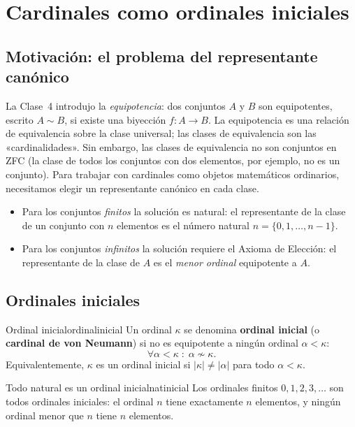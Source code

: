 \section{Cardinales como ordinales iniciales}

\subsection{Motivación: el problema del representante canónico}

La Clase~4 introdujo la \emph{equipotencia}: dos conjuntos $A$ y $B$ son equipotentes, escrito $A \sim B$, si existe una biyección $f \colon A \to B$. La equipotencia es una relación de equivalencia sobre la clase universal; las clases de equivalencia son las «cardinalidades». Sin embargo, las clases de equivalencia no son conjuntos en ZFC (la clase de todos los conjuntos con dos elementos, por ejemplo, no es un conjunto). Para trabajar con cardinales como objetos matemáticos ordinarios, necesitamos elegir un representante canónico en cada clase.

\begin{itemize}[leftmargin=2em]
  \item Para los conjuntos \emph{finitos} la solución es natural: el representante de la clase de un conjunto con $n$ elementos es el número natural $n = \{0,1,\ldots,n-1\}$.
  \item Para los conjuntos \emph{infinitos} la solución requiere el Axioma de Elección: el representante de la clase de $A$ es el \emph{menor ordinal} equipotente a $A$.
\end{itemize}

\subsection{Ordinales iniciales}

\begin{definicion}{Ordinal inicial}{ordinalinicial}
Un ordinal $\kappa$ se denomina \textbf{ordinal inicial} (o \textbf{cardinal de von Neumann}) si no es equipotente a ningún ordinal $\alpha < \kappa$:
\[
  \forall \alpha < \kappa \;:\; \alpha \not\sim \kappa.
\]
Equivalentemente, $\kappa$ es un ordinal inicial si $|\kappa| \neq |\alpha|$ para todo $\alpha < \kappa$.
\end{definicion}

\begin{observacion}{Todo natural es un ordinal inicial}{natinicial}
Los ordinales finitos $0, 1, 2, 3, \ldots$ son todos ordinales iniciales: el ordinal $n$ tiene exactamente $n$ elementos, y ningún ordinal menor que $n$ tiene $n$ elementos.
\end{observacion}

